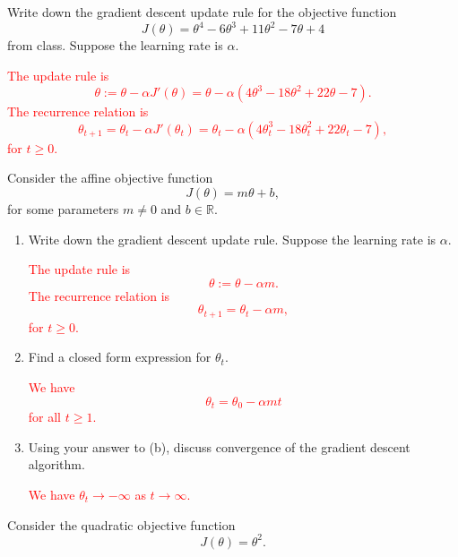 \documentclass[12pt,reqno]{amsart}
\begin{document}
\bigskip

\prob Write down the gradient descent update rule for the objective function
	\[J(\theta) = \theta^4 - 6\theta^3 + 11 \theta^2 - 7\theta + 4
	\]
from class. Suppose the learning rate is $\alpha$.

\bigskip
\textcolor{red}{The update rule is
	\[\theta := \theta - \alpha J'(\theta) = \theta - \alpha(4\theta^3 - 18\theta^2 +22 \theta -7).
	\]
The recurrence relation is
	\[\theta_{t+1} = \theta_{t} - \alpha J'(\theta_{t}) = \theta_t - \alpha(4\theta_t^3 - 18\theta_t^2 +22 \theta_t -7),
	\]
for $t\geq 0$.}
\bigskip













\prob Consider the affine objective function
	\[J(\theta) = m\theta + b,
	\]
for some parameters $m\neq 0$ and $b\in \mathbb{R}$.

\medskip
\begin{enumerate}
\item Write down the gradient descent update rule. Suppose the learning rate is $\alpha$.

\bigskip
\textcolor{red}{The update rule is
	\[\theta := \theta - \alpha m.
	\]
The recurrence relation is
	\[\theta_{t+1} = \theta_{t} - \alpha m,
	\]
for $t\geq 0$.}
\bigskip

\item Find a closed form expression for $\theta_{t}$.

\bigskip
\textcolor{red}{We have
	\[\theta_{t} = \theta_0 -\alpha mt
	\]
for all $t\geq 1$.}
\bigskip

\item Using your answer to (b), discuss convergence of the gradient descent algorithm.

\bigskip
\textcolor{red}{We have $\theta_t \to -\infty$ as $t\to \infty$.}
\bigskip
\end{enumerate}
















\prob Consider the quadratic objective function
	\[J(\theta) = \theta^2.
	\]
\end{document}
